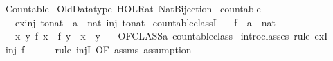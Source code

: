 %
\begin{isabellebody}%
%
%
\isadelimdocument
%
\endisadelimdocument
%
\isatagdocument
%
\isamarkuptrue%
%
\endisatagdocument
{\isafolddocument}%
%
\isadelimdocument
%
\endisadelimdocument
%
\isadelimtheory
%
\endisadelimtheory
%
\isatagtheory
{}\isamarkupfalse%
\ Countable\isanewline
{}\ Old{\isacharunderscore}Datatype\ HOL{\isachardot}Rat\ Nat{\isacharunderscore}Bijection\isanewline
{}%
\endisatagtheory
{\isafoldtheory}%
%
\isadelimtheory
%
\endisadelimtheory
%
\isadelimdocument
%
\endisadelimdocument
%
\isatagdocument
%
\isamarkuptrue%
%
\endisatagdocument
{\isafolddocument}%
%
\isadelimdocument
%
\endisadelimdocument
{}\isamarkupfalse%
\ countable\ {\isacharequal}\isanewline
\ \ \ ex{\isacharunderscore}inj{\isacharcolon}\ {\isachardoublequoteopen}{\isasymexists}to{\isacharunderscore}nat\ {\isacharcolon}{\isacharcolon}\ {\isacharprime}a\ {\isasymRightarrow}\ nat{\isachardot}\ inj\ to{\isacharunderscore}nat{\isachardoublequoteclose}\isanewline
\isanewline
{}\isamarkupfalse%
\ countable{\isacharunderscore}classI{\isacharcolon}\isanewline
\ \ \ f\ {\isacharcolon}{\isacharcolon}\ {\isachardoublequoteopen}{\isacharprime}a\ {\isasymRightarrow}\ nat{\isachardoublequoteclose}\isanewline
\ \ \ {\isachardoublequoteopen}{\isasymAnd}x\ y{\isachardot}\ f\ x\ {\isacharequal}\ f\ y\ {\isasymLongrightarrow}\ x\ {\isacharequal}\ y{\isachardoublequoteclose}\isanewline
\ \ \ {\isachardoublequoteopen}OFCLASS{\isacharparenleft}{\isacharprime}a{\isacharcomma}\ countable{\isacharunderscore}class{\isacharparenright}{\isachardoublequoteclose}\isanewline
%
\isadelimproof
%
\endisadelimproof
%
\isatagproof
{}\isamarkupfalse%
\ {\isacharparenleft}intro{\isacharunderscore}classes{\isacharcomma}\ rule\ exI{\isacharparenright}\isanewline
\ \ \isamarkupfalse%
\ {\isachardoublequoteopen}inj\ f{\isachardoublequoteclose}\isanewline
\ \ \ \ \isamarkupfalse%
\ {\isacharparenleft}rule\ injI\ {\isacharbrackleft}OF\ assms{\isacharbrackright}{\isacharparenright}\ assumption\isanewline
{}\isamarkupfalse%
%
\endisatagproof
{\isafoldproof}%
%
\isadelimproof
%
\endisadelimproof
%
\isadelimdocument
%
\endisadelimdocument
%
\isatagdocument
%
\isamarkuptrue%

\end{isabellebody}
